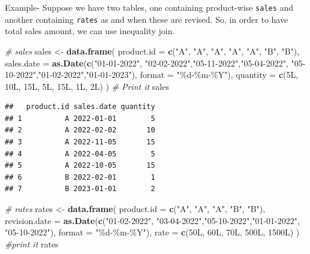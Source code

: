 \documentclass[
]{book}
\newenvironment{Shaded}{\begin{snugshade}}{\end{snugshade}}
\newcommand{\AttributeTok}[1]{\textcolor[rgb]{0.13,0.29,0.53}{#1}}
\newcommand{\CommentTok}[1]{\textcolor[rgb]{0.56,0.35,0.01}{\textit{#1}}}
\newcommand{\FunctionTok}[1]{\textcolor[rgb]{0.13,0.29,0.53}{\textbf{#1}}}
\newcommand{\NormalTok}[1]{#1}
\newcommand{\OtherTok}[1]{\textcolor[rgb]{0.56,0.35,0.01}{#1}}
\newcommand{\StringTok}[1]{\textcolor[rgb]{0.31,0.60,0.02}{#1}}
\begin{document}
Example- Suppose we have two tables, one containing product-wise \texttt{sales} and another containing \texttt{rates} as and when these are revised. So, in order to have total sales amount, we can use inequality join.

\begin{Shaded}
\begin{Highlighting}[]
\CommentTok{\# sales}
\NormalTok{sales }\OtherTok{\textless{}{-}} \FunctionTok{data.frame}\NormalTok{(}
  \AttributeTok{product.id =} \FunctionTok{c}\NormalTok{(}\StringTok{"A"}\NormalTok{, }\StringTok{"A"}\NormalTok{, }\StringTok{"A"}\NormalTok{, }\StringTok{"A"}\NormalTok{, }\StringTok{"A"}\NormalTok{, }\StringTok{"B"}\NormalTok{, }\StringTok{"B"}\NormalTok{),}
  \AttributeTok{sales.date =} \FunctionTok{as.Date}\NormalTok{(}\FunctionTok{c}\NormalTok{(}\StringTok{"01{-}01{-}2022"}\NormalTok{,}
                 \StringTok{"02{-}02{-}2022"}\NormalTok{,}\StringTok{"05{-}11{-}2022"}\NormalTok{,}\StringTok{"05{-}04{-}2022"}\NormalTok{,}
                 \StringTok{"05{-}10{-}2022"}\NormalTok{,}\StringTok{"01{-}02{-}2022"}\NormalTok{,}\StringTok{"01{-}01{-}2023"}\NormalTok{), }\AttributeTok{format =} \StringTok{"\%d{-}\%m{-}\%Y"}\NormalTok{),}
  \AttributeTok{quantity =} \FunctionTok{c}\NormalTok{(5L, 10L, 15L, 5L, 15L, 1L, 2L)}
\NormalTok{)}
\CommentTok{\# Print it}
\NormalTok{sales}
\end{Highlighting}
\end{Shaded}

\begin{verbatim}
##   product.id sales.date quantity
## 1          A 2022-01-01        5
## 2          A 2022-02-02       10
## 3          A 2022-11-05       15
## 4          A 2022-04-05        5
## 5          A 2022-10-05       15
## 6          B 2022-02-01        1
## 7          B 2023-01-01        2
\end{verbatim}

\begin{Shaded}
\begin{Highlighting}[]
\CommentTok{\# rates}
\NormalTok{rates }\OtherTok{\textless{}{-}} \FunctionTok{data.frame}\NormalTok{(}
  \AttributeTok{product.id =} \FunctionTok{c}\NormalTok{(}\StringTok{"A"}\NormalTok{, }\StringTok{"A"}\NormalTok{, }\StringTok{"A"}\NormalTok{, }\StringTok{"B"}\NormalTok{, }\StringTok{"B"}\NormalTok{),}
  \AttributeTok{revision.date =} \FunctionTok{as.Date}\NormalTok{(}\FunctionTok{c}\NormalTok{(}\StringTok{"01{-}02{-}2022"}\NormalTok{,}
                    \StringTok{"03{-}04{-}2022"}\NormalTok{,}\StringTok{"05{-}10{-}2022"}\NormalTok{,}\StringTok{"01{-}01{-}2022"}\NormalTok{,}
                    \StringTok{"05{-}10{-}2022"}\NormalTok{), }\AttributeTok{format =} \StringTok{"\%d{-}\%m{-}\%Y"}\NormalTok{),}
  \AttributeTok{rate =} \FunctionTok{c}\NormalTok{(50L, 60L, 70L, 500L, 1500L)}
\NormalTok{)}
\CommentTok{\#print it}
\NormalTok{rates}
\end{Highlighting}
\end{Shaded}
\end{document}
